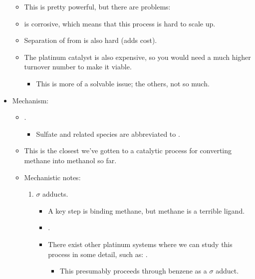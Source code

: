 \documentclass[../notes.tex]{subfiles}
\begin{document}
\begin{itemize}
\begin{itemize}
        \item This is pretty powerful, but there are problems:
        \item {} is corrosive, which means that this process is hard to scale up.
        \item Separation of  from  is also hard (adds cost).
        \item The platinum catalyst is also expensive, so you would need a much higher turnover number to make it viable.
        \begin{itemize}
            \item This is more of a solvable issue; the others, not so much.
        \end{itemize}
    \end{itemize}
    \item Mechanism:
    \begin{itemize}
        \item {}.
        \begin{itemize}
            \item Sulfate and related species are abbreviated to .
        \end{itemize}
        \item This is the closest we've gotten to a catalytic process for converting methane into methanol so far.
        \item Mechanistic notes:
        \begin{enumerate}
            \item $\sigma$ adducts.
            \begin{itemize}
                \item A key step is binding methane, but methane is a terrible ligand.
                \item {}.
                \item There exist other platinum systems where we can study this process in some detail, such as: .
                \begin{itemize}
                    \item This presumably proceeds through benzene as a $\sigma$ adduct.
                \end{itemize}
            \end{itemize}

\end{enumerate}
\end{itemize}
\end{itemize}
\end{document}
